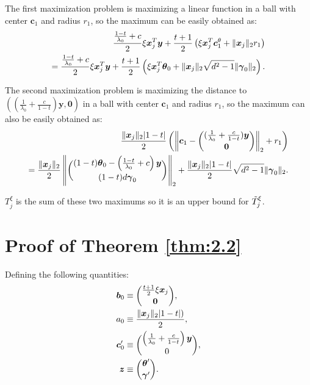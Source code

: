 The first maximization problem is maximizing a linear function in a ball with center $\boldsymbol c_1$ and radius $r_1$, so the maximum can be easily obtained as:
\begin{gather}
    \begin{aligned}
        \frac{\frac{1-t}{\lambda_0}+c}{2}\xi\boldsymbol x_j^T \boldsymbol y+\frac{t+1}{2}\left(\xi \boldsymbol x_j^T \boldsymbol c_1^\theta+\lVert\boldsymbol x_j\rVert_2r_1\right)\\
        =\frac{\frac{1-t}{\lambda_0}+c}{2}\xi\boldsymbol x_j^T \boldsymbol y+\frac{t+1}{2}\left(\xi \boldsymbol x_j^T \boldsymbol \theta_{0}+\lVert\boldsymbol x_j\rVert_2\sqrt{d^2-1}\lVert\boldsymbol\gamma_{0}\rVert_2\right).
    \end{aligned}
\end{gather}

The second maximization problem is maximizing the distance to $\left((\frac{1}{\lambda_0}+\frac{c}{1-t})\boldsymbol y,\boldsymbol 0\right)$ in a ball with center $\boldsymbol c_1$ and radius $r_1$, so the maximum can also be easily obtained as:
\begin{gather}
    \begin{aligned}
        \frac{\lVert\boldsymbol x_j\rVert_2|1-t|}{2}\left(\left\Vert\boldsymbol c_1-\binom{(\frac{1}{\lambda_0}+\frac{c}{1-t})\boldsymbol y}{\boldsymbol 0}\right\Vert_2+r_1\right)\\
        =\frac{\lVert\boldsymbol x_j\rVert_2}{2}\left\Vert\binom{(1-t)\boldsymbol\theta_{0}-\left(\frac{1-t}{\lambda_0}+c\right)\boldsymbol y}{(1-t)d\boldsymbol\gamma_{0}}\right\Vert_2+\frac{\lVert\boldsymbol x_j\rVert_2|1-t|}{2}\sqrt{d^2-1}\lVert\boldsymbol\gamma_0\rVert_2.
    \end{aligned}
\end{gather}

$T^\xi_j$ is the sum of these two maximums so it is an upper bound for $\Tilde{T}^\xi_j$.

\iffalse
\section{Proof of Theorem \ref{thm:2.2}}

Defining the following quantities:
\begin{gather}
    \begin{aligned}
        \boldsymbol b_0&\equiv\binom{\frac{t+1}{2}\xi \boldsymbol x_j}{\boldsymbol 0},\\
        a_0&\equiv\frac{\lVert\boldsymbol x_j\rVert_2|1-t|)}{2},\\
        \boldsymbol c_0'&\equiv\binom{\left(\frac{1}{\lambda_0}+\frac{c}{1-t}\right)\boldsymbol y}{0},\\
        \boldsymbol z &\equiv \binom{\boldsymbol\theta'}{\boldsymbol\gamma'}.
    \end{aligned}
\end{gather}

